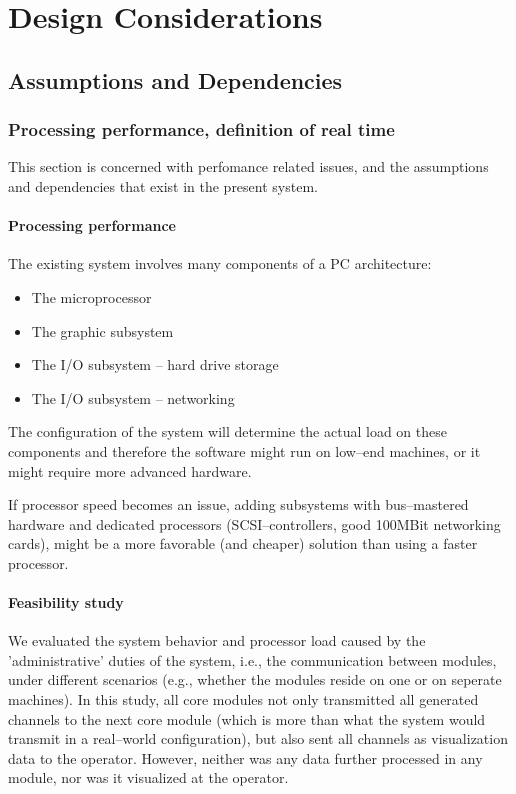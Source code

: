\chapter{Design Considerations}


\section{Assumptions and Dependencies}

\subsection{Processing performance, definition of real time}

This section is concerned with perfomance related issues, and the assumptions 
and dependencies that exist in the present system.

\subsubsection{Processing performance}

The existing system involves many components of a PC architecture:

\begin{itemize}
 \item{The microprocessor}
 \item{The graphic subsystem}
 \item{The I/O subsystem -- hard drive storage}
 \item{The I/O subsystem -- networking}
\end{itemize}

The configuration of the system will determine the actual load on these 
components and therefore the software might run on low--end machines, or it 
might require more advanced hardware.

If processor speed becomes an issue, adding subsystems with bus--mastered 
hardware and dedicated processors (SCSI--controllers, good 100MBit networking 
cards), might be a more favorable (and cheaper) solution than using a faster 
processor.

\subsubsection{Feasibility study}

We evaluated the system behavior and processor load caused by the 
'administrative' duties of the system, i.e., the communication between modules, 
under different scenarios (e.g., whether the modules reside on one or on 
seperate machines). In this study, all core modules not only transmitted all 
generated channels to the next core module (which is more than what the system 
would transmit in a real--world configuration), but also sent all channels as 
visualization data to the operator. However, neither was any data further 
processed in any module, nor was it visualized at the operator. 

